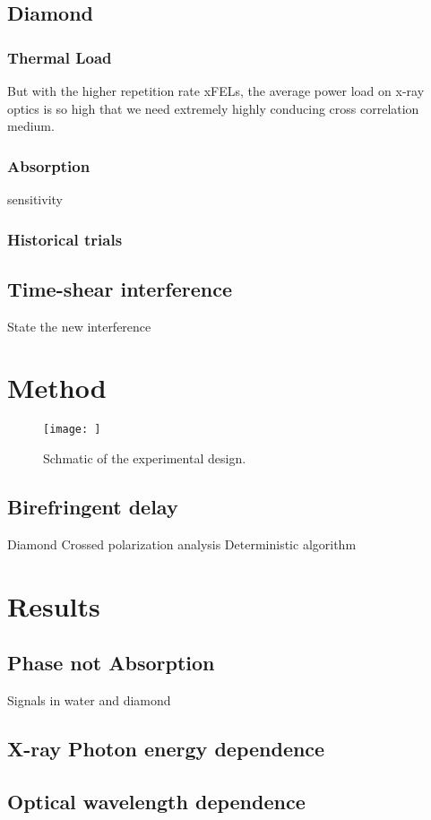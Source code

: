 \documentclass{article}
\newlength{\figwidth}
\begin{document}
\subsection{Diamond}
\subsubsection{Thermal Load}
	But with the higher repetition rate xFELs, the average power load on x-ray optics is so high that we need extremely highly conducing cross correlation medium.
\subsubsection{Absorption}
	sensitivity
\subsubsection{Historical trials}

\subsection{Time-shear interference}
State the new interference

\section{Method}
\begin{figure}
\centerline{\texttt{[image: ]}}
\caption{\label{fig::cartoon} Schmatic of the experimental design.}
\end{figure}
\subsection{Birefringent delay}
Diamond
Crossed polarization analysis
Deterministic algorithm
\section{Results}
\subsection{Phase not Absorption}
Signals in water and diamond
\subsection{X-ray Photon energy dependence}
\subsection{Optical wavelength dependence}
\end{document}
